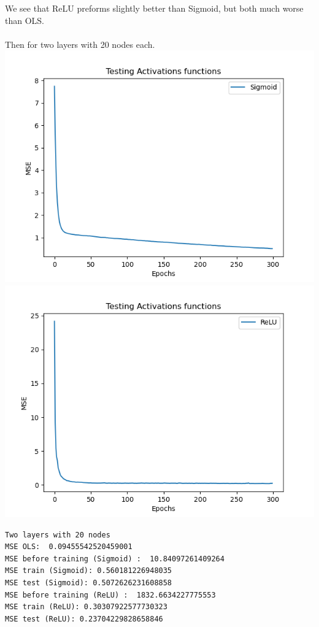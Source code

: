 \documentclass[12pt, letterpaper, twoside]{article}
\begin{document}
We see that ReLU preforms slightly better than Sigmoid, but both much worse than OLS.\\
\ \\
Then for two layers with 20 nodes each.\\
\includegraphics[scale=0.5]{"two_hidden_20_sigmoid"}\\
\includegraphics[scale=0.5]{"two_hidden_20_ReLU"}
\begin{verbatim}
Two layers with 20 nodes
MSE OLS:  0.09455542520459001
MSE before training (Sigmoid) :  10.84097261409264
MSE train (Sigmoid): 0.560181226948035
MSE test (Sigmoid): 0.5072626231608858
MSE before training (ReLU) :  1832.6634227775553
MSE train (ReLU): 0.30307922577730323
MSE test (ReLU): 0.23704229828658846
\end{verbatim}
\end{document}
